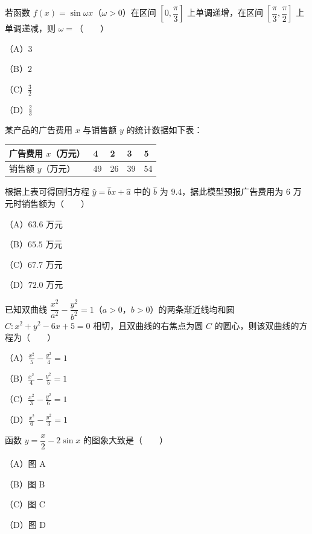 \begin{question}
若函数 $f(x)=\sin\omega x$（$\omega>0$）在区间 $\left[0,\dfrac{\pi}{3}\right]$ 上单调递增，在区间 $\left[\dfrac{\pi}{3},\dfrac{\pi}{2}\right]$ 上单调递减，则 $\omega=$\mbox{（　　）}

（A）$3$

（B）$2$

（C）$\frac32$

（D）$\frac23$

\end{question}
\begin{question}
某产品的广告费用 $x$ 与销售额 $y$ 的统计数据如下表：

\begin{center}
\begin{tabular}{lllll}
\toprule
广告费用 $x$（万元） & 4 & 2 & 3 & 5 \\
\midrule
销售额 $y$（万元） & 49 & 26 & 39 & 54 \\
\bottomrule
\end{tabular}
\end{center}

根据上表可得回归方程 $\hat y=\hat bx+\hat a$ 中的 $\hat b$ 为 $9.4$，据此模型预报广告费用为 $6$ 万元时销售额为\mbox{（　　）}

（A）$63.6$ 万元

（B）$65.5$ 万元

（C）$67.7$ 万元

（D）$72.0$ 万元

\end{question}
\begin{question}
已知双曲线 $\dfrac{x^2}{a^2}-\dfrac{y^2}{b^2}=1$（$a>0$，$b>0$）的两条渐近线均和圆 $C:x^2+y^2-6x+5=0$ 相切，且双曲线的右焦点为圆 $C$ 的圆心，则该双曲线的方程为\mbox{（　　）}

（A）$\frac{x^2}{5}-\frac{y^2}{4}=1$

（B）$\frac{x^2}{4}-\frac{y^2}{5}=1$

（C）$\frac{x^2}{3}-\frac{y^2}{6}=1$

（D）$\frac{x^2}{6}-\frac{y^2}{3}=1$

\Needspace{0.4\textheight}
\end{question}
\begin{question}
函数 $y=\dfrac x2-2\sin x$ 的图象大致是\mbox{（　　）}

（A）图 A

（B）图 B

（C）图 C

（D）图 D
\nopagebreak[4]
\begin{center}\end{center}
\nopagebreak[4]
\end{question}
